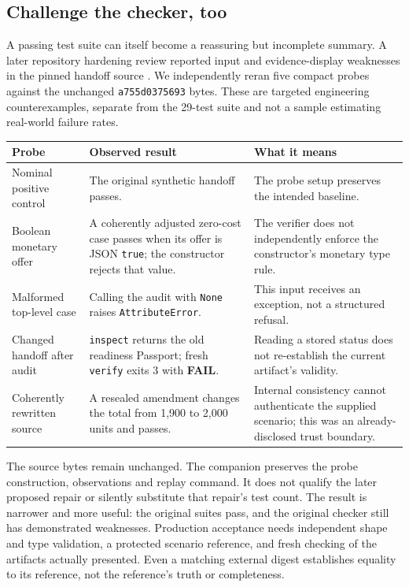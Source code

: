 \documentclass[11pt,a4paper]{article}
\newcommand{\status}[1]{\textsf{\textbf{#1}}}
\begin{document}
\subsection{Challenge the checker, too}\label{sec:checkerChallenge}
A passing test suite can itself become a reassuring but incomplete summary. A later repository hardening review reported input and evidence-display weaknesses in the pinned handoff source \cite{handoffHardening}. We independently reran five compact probes against the unchanged \texttt{a755d0375693} bytes. These are targeted engineering counterexamples, separate from the 29-test suite and not a sample estimating real-world failure rates.

\begin{center}\small
\begin{tabularx}{\textwidth}{P{.24\textwidth}YY}
\toprule
\textbf{Probe} & \textbf{Observed result} & \textbf{What it means}\\
\midrule
Nominal positive control & The original synthetic handoff passes. & The probe setup preserves the intended baseline.\\
Boolean monetary offer & A coherently adjusted zero-cost case passes when its offer is JSON \texttt{true}; the constructor rejects that value. & The verifier does not independently enforce the constructor's monetary type rule.\\
Malformed top-level case & Calling the audit with \texttt{None} raises \texttt{AttributeError}. & This input receives an exception, not a structured refusal.\\
Changed handoff after audit & \texttt{inspect} returns the old readiness Passport; fresh \texttt{verify} exits 3 with \status{FAIL}. & Reading a stored status does not re-establish the current artifact's validity.\\
Coherently rewritten source & A resealed amendment changes the total from 1,900 to 2,000 units and passes. & Internal consistency cannot authenticate the supplied scenario; this was an already-disclosed trust boundary.\\
\bottomrule
\end{tabularx}
\end{center}

The source bytes remain unchanged. The companion preserves the probe construction, observations and replay command. It does not qualify the later proposed repair or silently substitute that repair's test count. The result is narrower and more useful: the original suites pass, and the original checker still has demonstrated weaknesses. Production acceptance needs independent shape and type validation, a protected scenario reference, and fresh checking of the artifacts actually presented. Even a matching external digest establishes equality to its reference, not the reference's truth or completeness.
\end{document}

